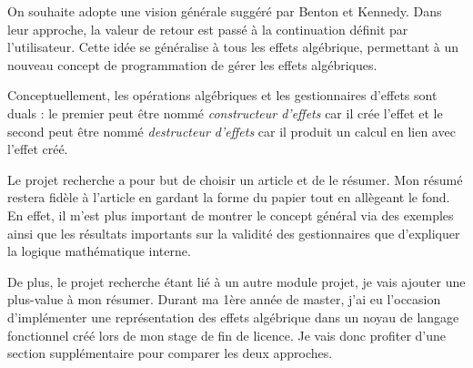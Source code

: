 	On souhaite adopte une vision générale suggéré par Benton et Kennedy. Dans leur approche, la valeur de retour est passé à la continuation définit par l'utilisateur. Cette idée se généralise à tous les effets algébrique, permettant à un nouveau concept de programmation de gérer les effets algébriques. 
	
	Conceptuellement, les opérations algébriques et les gestionnaires d'effets sont duals : le premier peut être nommé \textit{constructeur d'effets} car il crée l'effet et le second peut être nommé \textit{destructeur d'effets} car il produit un calcul en lien avec l'effet créé.
	\smallbreak
	
	Le projet recherche a pour but de choisir un article et de le résumer. Mon résumé restera fidèle à l'article en gardant
	la forme du papier tout en allègeant le fond. En effet, il m'est plus important de montrer le concept général via des exemples ainsi
	que les résultats importants sur la validité des gestionnaires que d'expliquer la logique mathématique interne.

	De plus, le projet recherche étant lié à un autre module projet, je vais ajouter une plus-value à mon résumer. Durant ma 
	1ère année de master, j'ai eu l'occasion d'implémenter une représentation des effets algébrique dans un noyau de langage fonctionnel créé lors de mon stage de fin de licence. Je vais donc profiter d'une section supplémentaire pour comparer les deux approches.
	
	